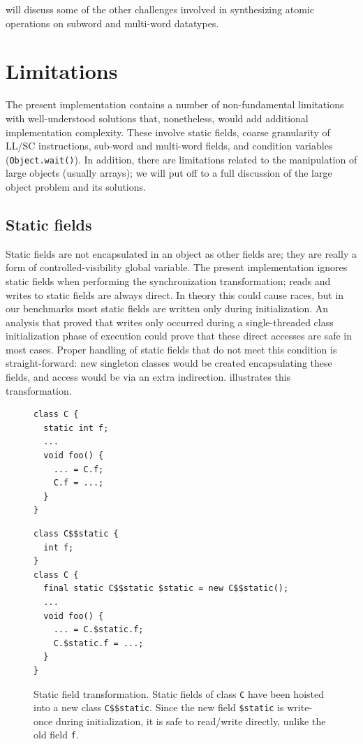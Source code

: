  will discuss some of the other challenges involved in
synthesizing atomic operations on subword and multi-word datatypes.

\section{Limitations}
The present implementation contains a number of non-fundamental
limitations with well-understood solutions that, nonetheless, would
add additional implementation complexity.  These involve static
fields, coarse granularity of LL/SC instructions, sub-word and
multi-word fields, and condition variables (\texttt{Object.wait()}).
In addition, there are
limitations related to the manipulation of large objects (usually
arrays); we will put off to  a full discussion of the
large object problem and its solutions.

\subsection{Static fields}
Static fields are not encapsulated in an object as other fields are;
they are really a form of controlled-visibility global variable.  The
present implementation ignores static fields when performing the
synchronization transformation; reads and writes to static fields are
always direct.  In theory this could cause races, but in our
benchmarks most static fields are written only during initialization.
An analysis that proved that writes only occurred during a
single-threaded class initialization phase of execution could prove
that these direct accesses are safe in most cases.  Proper handling of
static fields that do not meet this condition is straight-forward:
new singleton classes would be created encapsulating these fields, and
access would be via an extra indirection.  
illustrates this transformation.
\begin{figure}\sis\fontsize{9}{10}
\begin{minipage}[b]{1in}
\begin{verbatim}
class C {
  static int f;
  ...
  void foo() {
    ... = C.f;
    C.f = ...;
  }
}
\end{verbatim}
\end{minipage}
\raisebox{.4in}{$\quad\Rightarrow\quad$}
\begin{minipage}[b]{3in}
\begin{verbatim}
class C$$static {
  int f;
}
class C {
  final static C$$static $static = new C$$static();
  ...
  void foo() {
    ... = C.$static.f;
    C.$static.f = ...;
  }
}
\end{verbatim}
\end{minipage}%
\caption[Static field transformation.]
{Static field transformation.  Static fields of class \texttt{C} have
  been hoisted into a new class \texttt{C\$\$static}.  Since the new
  field \texttt{\$static} is write-once during initialization, it is
  safe to read/write directly, unlike the old field \texttt{f}.}
\label{fig:static-fields}
\end{figure}


